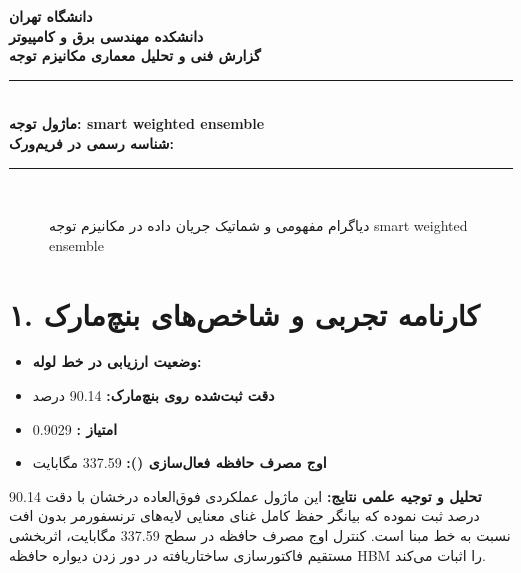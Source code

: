 \documentclass[12pt,a4paper]{article}
\begin{document}
\begin{center}
{\Large\bfseries دانشگاه تهران}\\[0.2cm]
{\large\bfseries دانشکده مهندسی برق و کامپیوتر}\\[0.2cm]
{\large\bfseries گزارش فنی و تحلیل معماری مکانیزم توجه}\\[0.5cm]
\rule{\linewidth}{1pt}\\[0.3cm]
{\LARGE\bfseries ماژول توجه: smart weighted ensemble}\\[0.2cm]
{\large \textbf{شناسه رسمی در فریم‌ورک:} }\\[0.2cm]
\rule{\linewidth}{1pt}\\[0.5cm]
\end{center}

\begin{figure}[H]
\centering
{}
\caption{دیاگرام مفهومی و شماتیک جریان داده در مکانیزم توجه smart weighted ensemble}
\end{figure}

\section*{۱. کارنامه تجربی و شاخص‌های بنچ‌مارک}
\begin{itemize}
\item \textbf{وضعیت ارزیابی در خط لوله:} 
\item \textbf{دقت ثبت‌شده روی بنچ‌مارک:} 90.14 درصد
\item \textbf{امتیاز :} 0.9029
\item \textbf{اوج مصرف حافظه فعال‌سازی ():} 337.59 مگابایت
\end{itemize}
\textbf{تحلیل و توجیه علمی نتایج:} این ماژول عملکردی فوق‌العاده درخشان با دقت 90.14 درصد ثبت نموده که بیانگر حفظ کامل غنای معنایی لایه‌های ترنسفورمر بدون افت نسبت به خط مبنا است. کنترل اوج مصرف حافظه در سطح 337.59 مگابایت، اثربخشی مستقیم فاکتورسازی ساختاریافته در دور زدن دیواره حافظه HBM را اثبات می‌کند.
\end{document}
